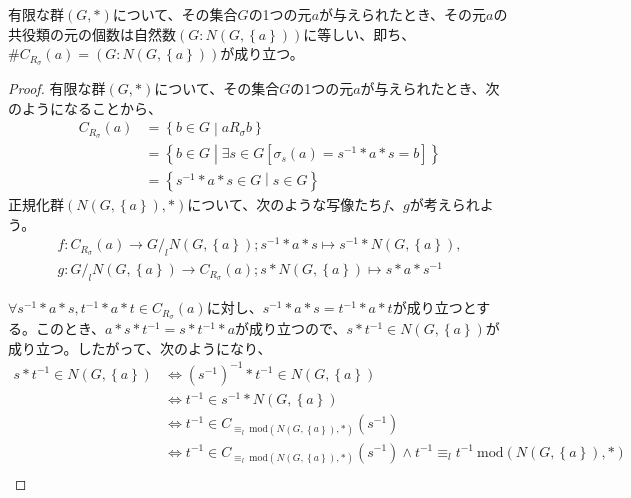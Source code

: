 \documentclass[dvipdfmx]{jsarticle}
\begin{document}
\begin{thm}\label{3.1.3.6}
有限な群$(G,*)$について、その集合$G$の1つの元$a$が与えられたとき、その元$a$の共役類の元の個数は自然数$\left( G:N\left( G,\left\{ a \right\} \right) \right)$に等しい、即ち、$\#{C_{R_{\sigma}}(a)} = \left( G:N\left( G,\left\{ a \right\} \right) \right)$が成り立つ。
\end{thm}
\begin{proof}
有限な群$(G,*)$について、その集合$G$の1つの元$a$が与えられたとき、次のようになることから、
\begin{align*}
C_{R_{\sigma}}(a) &= \left\{ b \in G \middle| aR_{\sigma}b \right\}\\
&= \left\{ b \in G \middle| \exists s \in G\left\lbrack \sigma_{s}(a) = s^{- 1}*a*s = b \right\rbrack \right\}\\
&= \left\{ s^{- 1}*a*s \in G \middle| s \in G \right\}
\end{align*}
正規化群$\left( N\left( G,\left\{ a \right\} \right),* \right)$について、次のような写像たち$f$、$g$が考えられよう。
\begin{align*}
f:C_{R_{\sigma}}(a) \rightarrow {G}/_l {N\left( G,\left\{ a \right\} \right)};s^{- 1}*a*s \mapsto s^{- 1}*N\left( G,\left\{ a \right\} \right),\\
g:{G}/_l {N\left( G,\left\{ a \right\} \right)} \rightarrow C_{R_{\sigma}}(a);s*N\left( G,\left\{ a \right\} \right) \mapsto s*a*s^{- 1}
\end{align*}\par
$\forall s^{- 1}*a*s,t^{- 1}*a*t \in C_{R_{\sigma}}(a)$に対し、$s^{- 1}*a*s = t^{- 1}*a*t$が成り立つとする。このとき、$a*s*t^{- 1} = s*t^{- 1}*a$が成り立つので、$s*t^{- 1} \in N\left( G,\left\{ a \right\} \right)$が成り立つ。したがって、次のようになり、
\begin{align*}
s*t^{- 1} \in N\left( G,\left\{ a \right\} \right) &\Leftrightarrow \left( s^{- 1} \right)^{- 1}*t^{- 1} \in N\left( G,\left\{ a \right\} \right)\\
&\Leftrightarrow t^{- 1} \in s^{- 1}*N\left( G,\left\{ a \right\} \right)\\
&\Leftrightarrow t^{- 1} \in C_{\equiv_{l}\ \mathrm{mod}\left( N\left( G,\left\{ a \right\} \right),* \right)}\left( s^{- 1} \right)\\
&\Leftrightarrow t^{- 1} \in C_{\equiv_{l}\ \mathrm{mod}\left( N\left( G,\left\{ a \right\} \right),* \right)}\left( s^{- 1} \right) \land t^{- 1} \equiv_{l}t^{- 1}\ \mathrm{mod}\left( N\left( G,\left\{ a \right\} \right),* \right)\\

\end{align*}
\end{proof}
\end{document}
